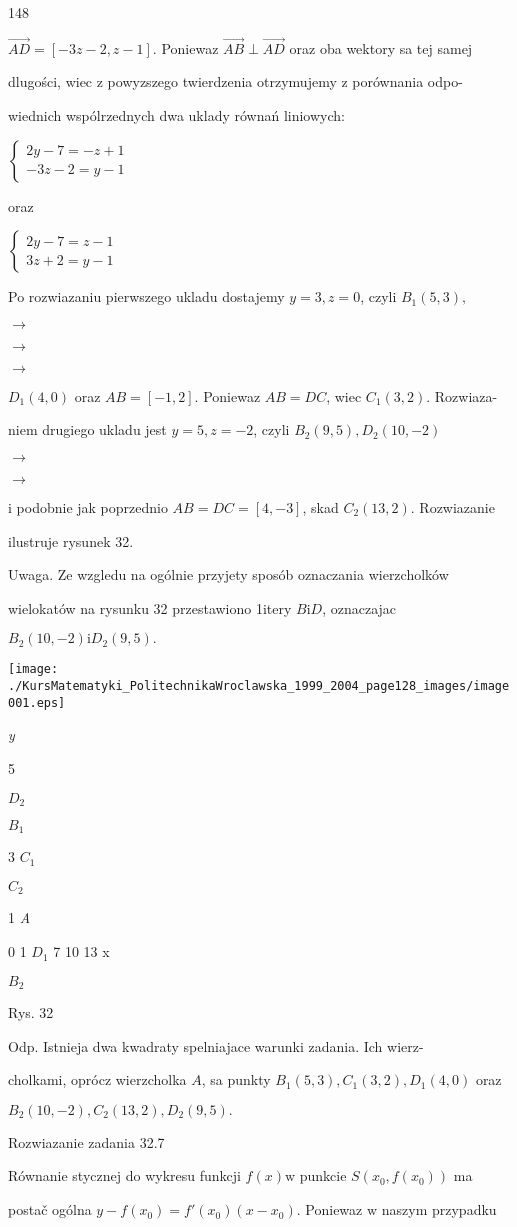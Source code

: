 \documentclass[a4paper,12pt]{article}
\begin{document}
148

$\vec{AD}= [-3z-2,z-1]$. Poniewaz $\vec{AB}\perp\vec{AD}$ oraz oba wektory sa tej samej

dlugości, wiec $\mathrm{z}$ powyzszego twierdzenia otrzymujemy $\mathrm{z}$ porównania odpo-

wiednich wspólrzednych dwa uklady równań liniowych:

$\left\{\begin{array}{l}
2y-7=-z+1\\
-3z-2=y-1
\end{array}\right.$

oraz

$\left\{\begin{array}{l}
2y-7=z-1\\
3z+2=y-1
\end{array}\right.$

Po rozwiazaniu pierwszego ukladu dostajemy $y=3, z=0$, czyli $B_{1}(5,3),$

$\rightarrow$

$\rightarrow$

$\rightarrow$

$D_{1}(4,0)$ oraz $AB= [-1,2]$. Poniewaz $AB=DC$, wiec $C_{1}(3,2)$. Rozwiaza-

niem drugiego ukladu jest $y = 5, z = -2$, czyli $B_{2}(9,5), D_{2}(10,-2)$

$\rightarrow$

$\rightarrow$

$\mathrm{i}$ podobnie jak poprzednio $AB=DC=[4,-3]$, skad $C_{2}(13,2)$. Rozwiazanie

ilustruje rysunek 32.

Uwaga. Ze wzgledu na ogólnie przyjety sposób oznaczania wierzcholków

wielokatów na rysunku 32 przestawiono 1itery $B \mathrm{i} D$, oznaczajac

$B_{2}(10,-2)\mathrm{i}D_{2}(9,5).$
\begin{center}
\texttt{[image: ./KursMatematyki\_PolitechnikaWroclawska\_1999\_2004\_page128\_images/image001.eps]}
\end{center}
{\it y}

5

$D_{2}$

$B_{1}$

3  $C_{1}$

$C_{2}$

1  {\it A}

0 1  $D_{1}$  7  10  13 x

$B_{2}$

Rys. 32

Odp. Istnieja dwa kwadraty spelniajace warunki zadania. Ich wierz-

cholkami, oprócz wierzcholka $A$, sa punkty $B_{1}(5,3), C_{1}(3,2), D_{1}(4,0)$ oraz

$B_{2}(10,-2), C_{2}(13,2), D_{2}(9,5).$

Rozwiazanie zadania 32.7

Równanie stycznej do wykresu funkcji $f(x)\mathrm{w}$ punkcie $S(x_{0},f(x_{0}))$ ma

postač ogólna $y-f(x_{0}) =f'(x_{0})(x-x_{0})$. Poniewaz $\mathrm{w}$ naszym przypadku
\end{document}
